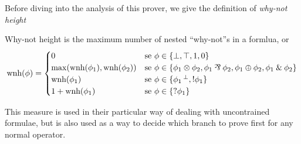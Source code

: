 \documentclass[a4paper, 12pt, tesi, english]{report}
\begin{document}
Before diving into the analysis of this prover, we give the definition of \textit{why-not height}
\begin{define}
	\label{def:why-not-height}
	Why-not height is the maximum number of nested ``why-not''s in a formlua, or
	$$ \text{wnh}(\phi) = 
	\begin{cases}	
		0 & \text{se }\phi \in \{\llbot, \lltop, \llone, \llzero\} \\
		\max(\text{wnh}(\phi_1), \text{wnh}(\phi_2)) & \text{se } \phi \in \{ \phi_1 \llten \phi_2, \phi_1 \llpar \phi_2, \phi_1 \llplus \phi_2, \phi_1 \llwith \phi_2 \} \\
		\text{wnh}(\phi_1) & \text{se }\phi \in \{ \llnot{\phi_1}, \llbang{\phi_1}\} \\
		1 + \text{wnh}(\phi_1) & \text{se }\phi \in \{ \llwn{\phi_1} \} 
	\end{cases}
	$$
\end{define}
This measure is used in their particular way of dealing with uncontrained formulae, but is also used as a way to decide which branch to prove first for any normal operator.
\end{document}

